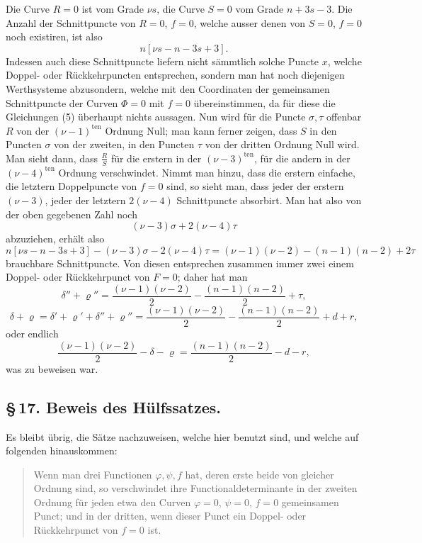 \documentclass[10pt]{article}
\begin{document}
Die Curve \(R=0\) ist vom Grade \(\nu s\), die Curve \(S=0\) vom Grade \(n+3s-3\). Die Anzahl der Schnittpuncte von \(R=0\), \(f=0\), welche ausser denen von \(S=0\), \(f=0\) noch existiren, ist also
\[
n[\nu s-n-3s+3].
\]
Indessen auch diese Schnittpuncte liefern nicht sämmtlich solche Puncte \(x\), welche Doppel- oder Rückkehrpuncten entsprechen, sondern man hat noch diejenigen Werthsysteme abzusondern, welche mit den Coordinaten der gemeinsamen Schnittpuncte der Curven \(\Phi=0\) mit \(f=0\) übereinstimmen, da für diese die Gleichungen (5) überhaupt nichts aussagen. Nun wird für die Puncte \(\sigma,\tau\) offenbar \(R\) von der \((\nu-1)^{\text{ten}}\) Ordnung Null; man kann ferner zeigen, dass \(S\) in den Puncten \(\sigma\) von der zweiten, in den Puncten \(\tau\) von der dritten Ordnung Null wird. Man sieht dann, dass \(\frac{R}{S}\) für die erstern in der \((\nu-3)^{\text{ten}}\), für die andern in der \((\nu-4)^{\text{ten}}\) Ordnung verschwindet. Nimmt man hinzu, dass die erstern einfache, die letztern Doppelpuncte von \(f=0\) sind, so sieht man, dass jeder der erstern \((\nu-3)\), jeder der letztern \(2(\nu-4)\) Schnittpuncte absorbirt. Man hat also von der oben gegebenen Zahl noch
\[
(\nu-3)\sigma+2(\nu-4)\tau
\]
abzuziehen, erhält also
\[
n[\nu s-n-3s+3]-(\nu-3)\sigma-2(\nu-4)\tau
=(\nu-1)(\nu-2)-(n-1)(n-2)+2\tau
\]
brauchbare Schnittpuncte. Von diesen entsprechen zusammen immer zwei einem Doppel- oder Rückkehrpunct von \(F=0\); daher hat man
\[
\delta''+\varrho''
=
\frac{(\nu-1)(\nu-2)}{2}
-\frac{(n-1)(n-2)}{2}
+\tau,
\]
\[
\delta+\varrho
=\delta'+\varrho'+\delta''+\varrho''
=
\frac{(\nu-1)(\nu-2)}{2}
-\frac{(n-1)(n-2)}{2}
+d+r,
\]
oder endlich
\[
\frac{(\nu-1)(\nu-2)}{2}-\delta-\varrho
=
\frac{(n-1)(n-2)}{2}-d-r,
\]
was zu beweisen war.

\subsection*{\S\,17. Beweis des Hülfssatzes.}

Es bleibt übrig, die Sätze nachzuweisen, welche hier benutzt sind, und welche auf folgenden hinauskommen:

\begin{quote}
Wenn man drei Functionen \(\varphi,\psi,f\) hat, deren erste beide von gleicher Ordnung sind, so verschwindet ihre Functionaldeterminante in der zweiten Ordnung für jeden etwa den Curven \(\varphi=0\), \(\psi=0\), \(f=0\) gemeinsamen Punct; und in der dritten, wenn dieser Punct ein Doppel- oder Rückkehrpunct von \(f=0\) ist.
\end{quote}
\end{document}
